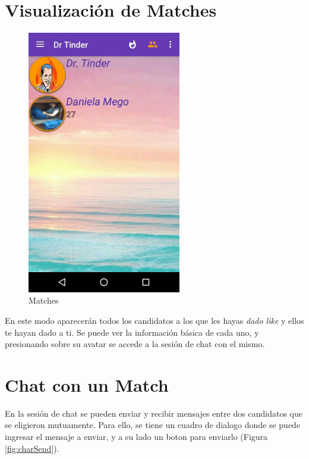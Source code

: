 \documentclass[10pt,letterpaper,extrafontsizes]{memoir}
\begin{document}
\newpage
\section{Visualización de Matches}

\begin{figure}[H]
    \centering
\includegraphics[width=0.6\textwidth]{graficos/capturas/q}
    \caption{Matches}
    \label{fig:matchesp}
\end{figure}

En este modo aparecerán todos los candidatos a los que les hayas \emph{dado like} y ellos te hayan dado a ti. Se puede ver la información básica de cada uno, y presionando sobre su avatar se accede a la sesión de chat con el mismo.

\section{Chat con un Match}

En la sesión de chat se pueden enviar y recibir mensajes entre dos candidatos que se eligieron mutuamente. Para ello, se tiene un cuadro de dialogo donde se puede ingresar el mensaje a enviar, y a su lado un boton para enviarlo (Figura \ref{fig:charSend}).
\end{document}
